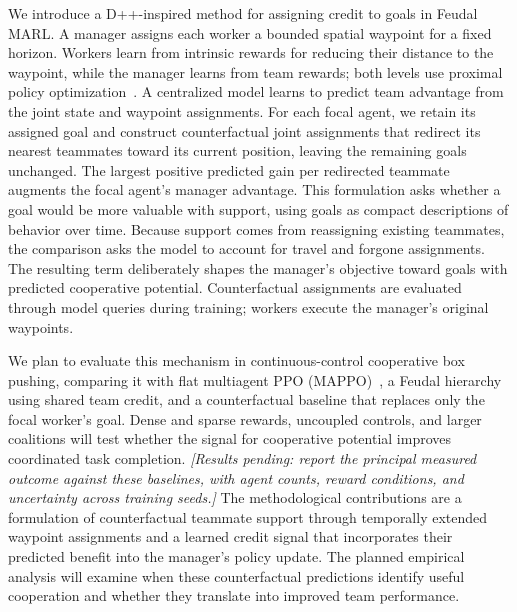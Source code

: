 We introduce a D++-inspired method for assigning credit to goals in Feudal
MARL. A manager assigns each worker a bounded spatial waypoint for a fixed
horizon. Workers learn from intrinsic rewards for reducing their distance to
the waypoint, while the manager learns from team rewards; both levels use
proximal policy optimization~\cite{schulman2017ppo}. A centralized model
learns to predict team advantage from the joint state and waypoint assignments.
For each focal agent, we retain its assigned goal and construct counterfactual
joint assignments that redirect its nearest teammates toward its current
position, leaving the remaining goals unchanged. The largest positive
predicted gain per redirected teammate augments the focal agent's manager
advantage. This formulation asks whether a goal would be more valuable with
support, using goals as compact descriptions of behavior over time. Because
support comes from reassigning existing teammates, the comparison asks the
model to account for travel and forgone assignments. The resulting term
deliberately shapes the manager's objective toward goals with predicted
cooperative potential. Counterfactual assignments are evaluated through model
queries during training; workers execute the manager's original waypoints.

We plan to evaluate this mechanism in continuous-control cooperative box
pushing, comparing it with flat multiagent PPO (MAPPO)~\cite{yu2022mappo},
a Feudal hierarchy using shared team credit, and a counterfactual baseline
that replaces only the focal worker's goal. Dense and sparse rewards, uncoupled
controls, and larger coalitions will test whether the signal for cooperative
potential improves coordinated task completion.
\textit{[Results pending: report the principal measured outcome against these
baselines, with agent counts, reward conditions, and uncertainty across
training seeds.]}
The methodological contributions are a formulation of counterfactual teammate
support through temporally extended waypoint assignments and a learned
credit signal that incorporates their predicted benefit into the manager's
policy update. The planned empirical analysis will examine when these
counterfactual predictions identify useful cooperation and whether they
translate into improved team performance.
